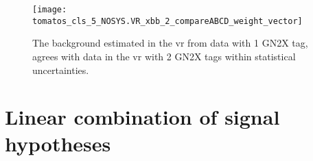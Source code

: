 \begin{figure}
    \centering
    \texttt{[image: tomatos\_cls\_5\_NOSYS.VR\_xbb\_2\_compareABCD\_weight\_vector]}
    \caption[]{The background estimated in the \ac{vr} from data with 1 GN2X tag, agrees with data in the \ac{vr} with 2 GN2X tags within statistical uncertainties.}
    \label{fig:bkg-validation}
\end{figure}

\section{Linear combination of signal hypotheses}\label{sec:linear_combination}
\newcommand{\kl}{\kappa_\lambda}
\newcommand{\kt}{\kappa_t}
\newcommand{\kvv}{\kappa_\text{2V}}
\newcommand{\kv}{\kappa_\text{V}}
\newcommand{\mhh}{m_\text{HH}}

